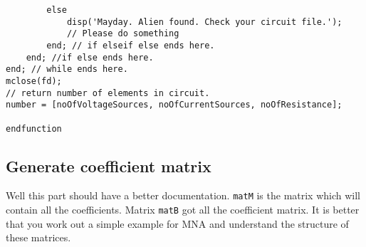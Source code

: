 \documentclass[a4paper,10pt]{article}
\begin{document}
\begin{verbatim}
        else
            disp('Mayday. Alien found. Check your circuit file.');
            // Please do something
        end; // if elseif else ends here.
    end; //if else ends here.
end; // while ends here.
mclose(fd);
// return number of elements in circuit.
number = [noOfVoltageSources, noOfCurrentSources, noOfResistance];

endfunction
\end{verbatim}

\subsection{Generate coefficient matrix}
Well this part should have a better documentation. \texttt{matM} is the matrix
which will contain all the coefficients. Matrix \texttt{matB} got all  the
coefficient matrix. It is better that you work out a simple example for MNA and
understand the structure of these matrices.
\par
\end{document}
